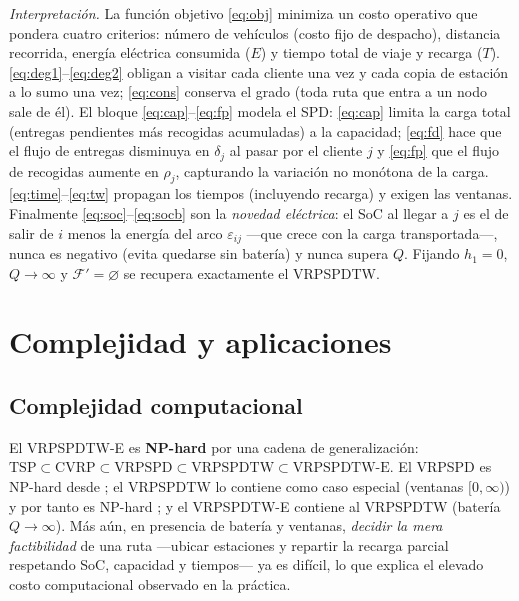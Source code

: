 \documentclass[conference]{IEEEtran}
\begin{document}
\emph{Interpretaci\'on.} La funci\'on objetivo \eqref{eq:obj} minimiza un costo
operativo que pondera cuatro criterios: n\'umero de veh\'iculos (costo fijo de
despacho), distancia recorrida, energ\'ia el\'ectrica consumida ($E$) y tiempo
total de viaje y recarga ($T$). \eqref{eq:deg1}--\eqref{eq:deg2} obligan a
visitar cada cliente una vez y
cada copia de estaci\'on a lo sumo una vez; \eqref{eq:cons} conserva el grado
(toda ruta que entra a un nodo sale de \'el). El bloque \eqref{eq:cap}--\eqref{eq:fp}
modela el SPD: \eqref{eq:cap} limita la carga total (entregas pendientes m\'as
recogidas acumuladas) a la capacidad; \eqref{eq:fd} hace que el flujo de entregas
disminuya en $\delta_j$ al pasar por el cliente $j$ y \eqref{eq:fp} que el flujo
de recogidas aumente en $\rho_j$, capturando la variaci\'on no mon\'otona de la
carga. \eqref{eq:time}--\eqref{eq:tw} propagan los tiempos (incluyendo recarga) y
exigen las ventanas. Finalmente \eqref{eq:soc}--\eqref{eq:socb} son la
\emph{novedad el\'ectrica}: el SoC al llegar a $j$ es el de salir de $i$ menos la
energ\'ia del arco $\varepsilon_{ij}$ ---que crece con la carga transportada---, nunca es
negativo (evita quedarse sin bater\'ia) y nunca supera $Q$. Fijando $h_1=0$,
$Q\to\infty$ y $\mathcal{F}'=\varnothing$ se recupera exactamente el VRPSPDTW.

\section{Complejidad y aplicaciones}\label{sec:comp}
\subsection{Complejidad computacional}
El VRPSPDTW-E es \textbf{NP-hard} por una cadena de generalizaci\'on:
$\text{TSP}\subset\text{CVRP}\subset\text{VRPSPD}\subset\text{VRPSPDTW}
\subset\text{VRPSPDTW-E}$. El VRPSPD es NP-hard desde \cite{min1989}; el VRPSPDTW
lo contiene como caso especial (ventanas $[0,\infty)$) y por tanto es NP-hard
\cite{liu2021mate}; y el VRPSPDTW-E contiene al VRPSPDTW (bater\'ia
$Q\to\infty$). M\'as a\'un, en presencia de bater\'ia y ventanas, \emph{decidir
la mera factibilidad} de una ruta ---ubicar estaciones y repartir la recarga
parcial respetando SoC, capacidad y tiempos--- ya es dif\'icil, lo que explica el
elevado costo computacional observado en la pr\'actica.
\end{document}

